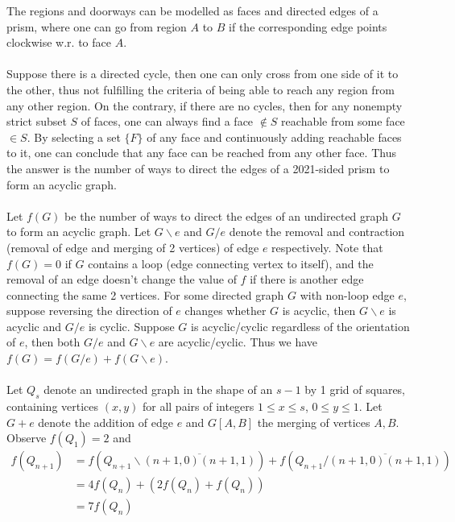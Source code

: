 \begin{solution}\hfil\medskip

    The regions and doorways can be modelled as faces and directed edges of a prism, 
	where one can go from region $A$ to $B$ if the corresponding edge points clockwise w.r. to face $A$. \\ \\
	Suppose there is a directed cycle, then one can only cross from one side of it to the other, 
	thus not fulfilling the criteria of being able to reach any region from any other region. On the contrary, 
	if there are no cycles, then for any nonempty strict subset $S$ of faces, one can always find a face $\notin S$ 
	reachable from some face $\in S$. By selecting a set $\{F\}$ of any face and continuously adding reachable faces to it, 
	one can conclude that any face can be reached from any other face. Thus the answer is the number of ways to 
	direct the edges of a 2021-sided prism to form an acyclic graph. \\ \\
	Let $f(G)$ be the number of ways to direct the edges of an undirected graph $G$ to form an acyclic graph. 
	Let $G\backslash e$ and $G/e$ denote the removal and contraction (removal of edge and merging of 2 vertices) of edge $e$ 
	respectively. Note that $f(G) = 0$ if $G$ contains a loop (edge connecting vertex to itself), 
	and the removal of an edge doesn't change the value of $f$ if there is another edge connecting the same 2 vertices. 
	For some directed graph $G$ with non-loop edge $e$, suppose reversing the direction of $e$ changes whether $G$ is acyclic, 
	then $G\backslash e$ is acyclic and $G/e$ is cyclic. Suppose $G$ is acyclic/cyclic regardless of the orientation of $e$, 
	then both $G/e$ and $G\backslash e$ are acyclic/cyclic. Thus we have $f(G) = f(G/e) + f(G\backslash e)$. \\ \\
	Let $Q_s$ denote an undirected graph in the shape of an $s-1$ by 1 grid of squares,
	containing vertices $(x, y)$ for all pairs of integers $1 \leq x \leq s$, $0 \leq y \leq 1$.
	Let $G+e$ denote the addition of edge $e$ and $G[A,B]$ the merging of vertices $A,B$. Observe $f(Q_1) = 2$ and 
	\begin{align*}
	f(Q_{n+1}) &= f\left(Q_{n+1}\backslash\overline{(n+1,0)(n+1,1)}\right) + f\left(Q_{n+1}/\overline{(n+1,0)(n+1,1)}\right)\\
	&= 4f(Q_n) + (2f(Q_n) + f(Q_n))\\
	&= 7f(Q_n)
	\end{align*}

\end{solution}
